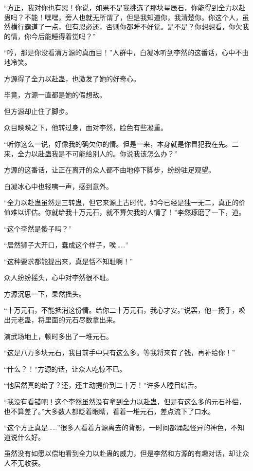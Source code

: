 \begin{this_body}
“方正，我对你也有恩！你说，如果不是我挑选了那块星辰石，你能得到全力以赴蛊吗？不能！嘿嘿，旁人也就无所谓了，但是我知道你，我清楚你。你这个人，虽然横行霸道了一点，但有恩必还，否则你都睡不好觉。是不是？你想想看，你欠我的情，你今后能睡得着觉吗？”

“哼，那是你没看清方源的真面目！”人群中，白凝冰听到李然的这番话，心中不由地冷笑。

方源得了全力以赴蛊，也激发了她的好奇心。

毕竟，方源一直都是她的假想敌。

但方源却止住了脚步。

众目睽睽之下，他转过身，面对李然，脸色有些凝重。

“听你这么一说，好像我的确欠你的情。但是一来，本身就是你冒犯我在先。二来，全力以赴蛊我是不可能给别人的。你说我该怎么办？”

方源的这番话，让正在离开的众人都不由地停下脚步，纷纷驻足观望。

白凝冰心中也轻咦一声，感到意外。

“全力以赴蛊虽然是三转蛊，但它来源上古时代，如今已经是独一无二，真正的价值难以评估。你就给我十万元石，就不算欠我的人情了！”李然琢磨了一下，道。

“这个李然是傻子吗？”

“居然狮子大开口，蠢成这个样子，唉……”

“这种要求都能提出来，真是恬不知耻啊！”

众人纷纷摇头，心中对李然很不耻。

方源沉思一下，果然摇头。

“十万元石，不能抵消这份情。给你二十万元石，我心才安。”说罢，他一扬手，唤出元老蛊，将里面的元石尽数拿出来。

演武场地上，顿时多出了一堆元石。

“这是八万多块元石，我目前手中只有这么多。等我将来有了钱，再补给你！”

“什么？！”方源的话，让众人吃惊不已。

“他居然真的给了？还，还主动提价到二十万！”许多人瞠目结舌。

“我没有看错吧！这个李然虽然没有拿到全力以赴蛊，但是有这么多的元石补偿，也不算差了。”大多数人都眨着眼睛，看着一堆元石，差点流下了口水。

“这个方正真是……”很多人看着方源离去的背影，一时间都涌起怪异的神色，不知道说什么好。

虽然没有如愿以偿地看到全力以赴蛊的威力，但是李然和方源的有趣对话，却让众人不无收获。


\end{this_body}
